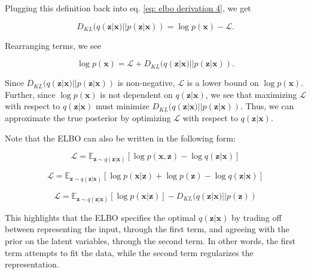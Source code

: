 \noindent Plugging this definition back into eq. \ref{eq: elbo derivation 4}, we get

   \begin{equation}
 	D_{KL}(q (\mathbf{z} | \mathbf{x}) || p (\mathbf{z} | \mathbf{x})) = \log p (\mathbf{x})  - \mathcal{L}.
	\label{eq: elbo derivation 6}
 \end{equation}
 
 \noindent Rearranging terms, we see
 
    \begin{equation}
 	\log p (\mathbf{x})  =  \mathcal{L} + D_{KL}(q (\mathbf{z} | \mathbf{x}) || p (\mathbf{z} | \mathbf{x})).
	\label{eq: elbo derivation 7}
 \end{equation}

\noindent Since $D_{KL}(q (\mathbf{z} | \mathbf{x}) || p (\mathbf{z} | \mathbf{x}))$ is non-negative, $\mathcal{L}$ is a lower bound on $\log p (\mathbf{x})$. Further, since $\log p (\mathbf{x})$ is not dependent on $q (\mathbf{z} | \mathbf{x})$, we see that maximizing $\mathcal{L}$ with respect to $q (\mathbf{z} | \mathbf{x})$ must minimize $D_{KL}(q (\mathbf{z} | \mathbf{x}) || p (\mathbf{z} | \mathbf{x}))$. Thus, we can approximate the true posterior by optimizing $\mathcal{L}$ with respect to $q (\mathbf{z} | \mathbf{x})$.

Note that the ELBO can also be written in the following form:

\begin{equation}
 	\mathcal{L} = \mathbb{E}_{\mathbf{z} \sim q (\mathbf{z} | \mathbf{x})} \left[ \log p (\mathbf{x}, \mathbf{z}) - \log q (\mathbf{z} | \mathbf{x}) \right]
	\label{eq: elbo derivation 8}
 \end{equation}
 
\begin{equation}
 	\mathcal{L} = \mathbb{E}_{\mathbf{z} \sim q (\mathbf{z} | \mathbf{x})} \left[ \log p (\mathbf{x} | \mathbf{z})  + \log p(\mathbf{z}) - \log q (\mathbf{z} | \mathbf{x}) \right]
	\label{eq: elbo derivation 9}
 \end{equation}
 
\begin{equation}
 	\mathcal{L} = \mathbb{E}_{\mathbf{z} \sim q (\mathbf{z} | \mathbf{x})} \left[ \log p (\mathbf{x} | \mathbf{z}) \right] - D_{KL}(q (\mathbf{z} | \mathbf{x}) || p (\mathbf{z}))
	\label{eq: elbo derivation 10}
 \end{equation}

\noindent This highlights that the ELBO specifies the optimal $q (\mathbf{z} | \mathbf{x})$ by trading off between representing the input, through the first term, and agreeing with the prior on the latent variables, through the second term. In other words, the first term attempts to fit the data, while the second term regularizes the representation.



